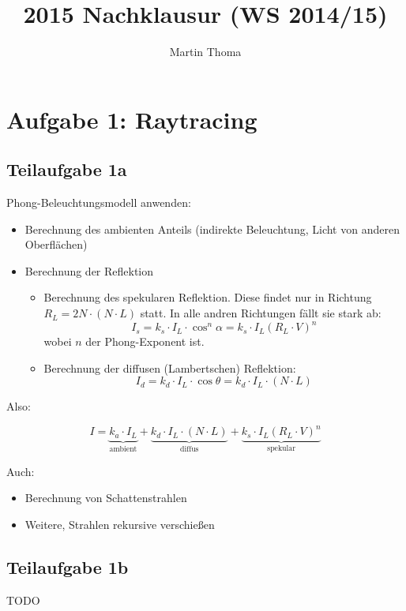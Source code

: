 \documentclass[a4paper]{scrartcl}
\begin{document}
\title{2015 Nachklausur (WS 2014/15)}
\author{Martin Thoma}

\setcounter{section}{1}
\section*{Aufgabe 1: Raytracing}
\subsection*{Teilaufgabe 1a}
Phong-Beleuchtungsmodell anwenden:

\begin{itemize}
    \item Berechnung des ambienten Anteils (indirekte Beleuchtung, Licht von anderen Oberflächen)
    \item Berechnung der Reflektion
    \begin{itemize}
        \item Berechnung des spekularen Reflektion. Diese findet nur in Richtung
              $R_L = 2 N \cdot (N \cdot L)$ statt. In alle andren Richtungen
              fällt sie stark ab:
              \[I_s = k_s \cdot I_L \cdot \cos^n \alpha = k_s \cdot I_L (R_L \cdot V)^n\]
              wobei $n$ der Phong-Exponent ist.
        \item Berechnung der diffusen (Lambertschen) Reflektion:
              \[I_d = k_d \cdot I_L \cdot \cos \theta = k_d \cdot I_L \cdot (N \cdot L) \]
    \end{itemize}
\end{itemize}

Also:

\[I = \underbrace{k_a \cdot I_L}_{\text{ambient}} + \underbrace{k_d \cdot I_L \cdot (N \cdot L)}_{\text{diffus}} + \underbrace{k_s \cdot I_L (R_L \cdot V)^n}_{\text{spekular}}\]

Auch:

\begin{itemize}
    \item Berechnung von Schattenstrahlen
    \item Weitere, Strahlen rekursive verschießen
\end{itemize}


\subsection*{Teilaufgabe 1b}
TODO
\end{document}
